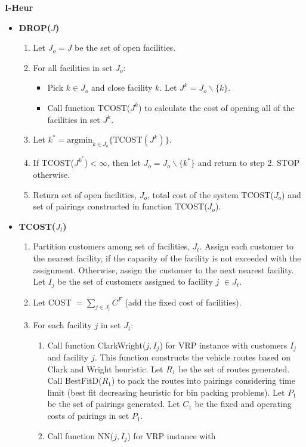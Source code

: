 {\bf I-Heur}
\begin{itemize}
\item {\bf DROP($J$)}
\begin{enumerate}
\item Let $J_o = J$ be the set of open facilities.
\item For all facilities in set $J_o$:
  \begin{itemize}
  \item[i.]Pick $k \in J_o$ and close facility $k$.
    Let $J^k = J_o \backslash \{k\}$.
  \item[ii.] Call function TCOST($J^k$) to calculate the cost of opening all
    of the facilities in set $J^k$. 
  \end{itemize}
\item Let $k^* = \mbox{argmin}_{k \in J_o}\{\mbox{TCOST}(J^k)\}$.
\item If TCOST($J^{k^*}$)$< \infty$, then 
  let  $J_o = J_o \backslash \{k^*\}$ and return to step 2.
  STOP otherwise.
\item Return set of open facilities, $J_o$, total cost of the system
  TCOST($J_o$) and set of pairings constructed in function TCOST($J_o$).
\end{enumerate}
\item {\bf TCOST($J_t$)}
\begin{enumerate}
\item Partition customers among set of facilities, $J_t$.
  Assign each customer to the nearest facility, if the capacity
  of the facility is not exceeded with the assignment. Otherwise,
  assign the customer to the next nearest facility. Let $I_j$
  be the set of customers assigned to facility $j$ $\in J_t$.
\item Let COST $= \sum_{j \in J_t}C^F$ (add the fixed cost of facilities). 
\item For each facility $j$ in set $J_t$:
  \begin{enumerate}
  \item[i.]Call function ClarkWright($j,I_j$) for VRP instance with 
    customers $I_j$  and facility $j$. This function constructs the vehicle routes
    based on Clark and Wright heuristic. Let $R_1$ be the set of routes
    generated. Call BestFitD($R_1$) to pack the routes into pairings 
    considering time limit (best fit decreasing heuristic for bin packing
    problems). Let $P_1$ be the set of pairings generated.
    Let $C_1$ be the fixed and operating costs of pairings in set $P_1$. 
  \item [ii.]Call function NN($j,I_j$) for VRP instance with 

\end{enumerate}
\end{enumerate}
\end{itemize}
